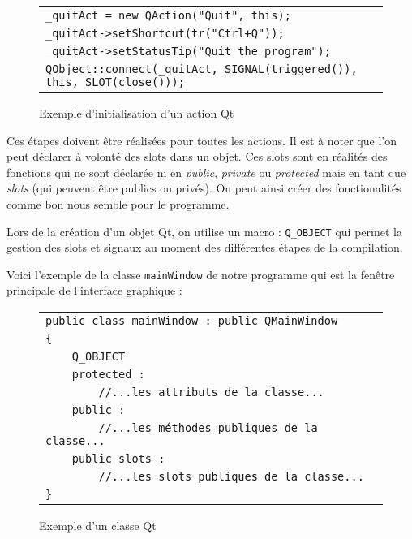 \begin{figure}[H]
   \begin{center}
      \begin{tabular}{l}
         \hline
         \verb|_quitAct = new QAction("Quit", this);|\\
         \verb|_quitAct->setShortcut(tr("Ctrl+Q"));|\\
         \verb|_quitAct->setStatusTip("Quit the program");|\\
         \verb|QObject::connect(_quitAct, SIGNAL(triggered()), this, SLOT(close()));|\\
         \hline
      \end{tabular}
   \end{center}
\caption{\label{exemple_initAction_qt} Exemple d'initialisation d'un action Qt}
\end{figure}

Ces \'etapes doivent \^etre r\'ealis\'ees pour toutes les actions. Il est \`a noter que l'on peut d\'eclarer \`a volont\'e des slots dans un objet. Ces slots sont en r\'ealit\'es des fonctions qui ne sont d\'eclar\'ee ni en \textit{public}, \textit{private} ou \textit{protected} mais en tant que \textit{slots} (qui peuvent \^etre publics ou priv\'es). On peut ainsi cr\'eer des fonctionalit\'es comme bon nous semble pour le programme.

\par
Lors de la cr\'eation d'un objet Qt, on utilise un macro : \verb|Q_OBJECT| qui permet la gestion des slots et signaux au moment des diff\'erentes \'etapes de la compilation.

\par
Voici l'exemple de la classe \verb|mainWindow| de notre programme qui est la fen\^etre  principale de l'interface graphique :

\begin{figure}[H]
   \begin{center}
      \begin{tabular}{l}
         \hline
         \verb|public class mainWindow : public QMainWindow|\\
\verb|{|\\
\verb|    Q_OBJECT|\\
         \verb|    protected :|\\
         \verb|        //...les attributs de la classe...|\\
         \verb|    public :|\\
         \verb|        //...les méthodes publiques de la classe...|\\
         \verb|    public slots :|\\
         \verb|        //...les slots publiques de la classe...|\\
\verb|}|\\
         \hline
      \end{tabular}
   \end{center}
\caption{\label{exemple_mainWindow_qt} Exemple d'un classe Qt}
\end{figure}

